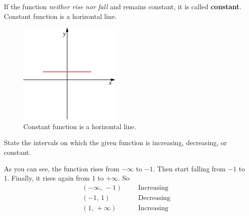 If the function \textit{neither rise nor fall} and remains constant, it is called \textbf{constant}. Constant function is a horizontal line.
\begin{figure}[ht]
    \centering
    \includegraphics[width=5cm]{Pics/constant.png}
    \caption{Constant function is a horizontal line.}
    \label{fig:const}
\end{figure}
\begin{exa}
    State the intervals on which the given function is increasing, decreasing, or constant.
\end{exa}
\begin{center}
\end{center}
As you can see, the function rises from $-\infty$ to $-1$. Then start falling from $-1$ to $1$. Finally, it rises again from $1$ to $+\infty$. So
\begin{align*}
        (-\infty,\, -1)&    &&\text{Increasing}\\
        (-1,\, 1)&  &&\text{Decreasing}\\
         (1,\, +\infty)& &  &\text{Increasing}
\end{align*}

